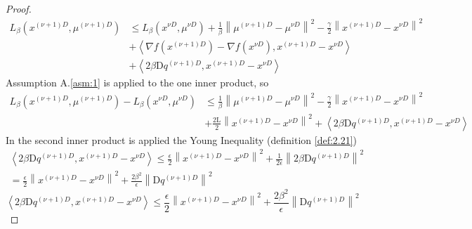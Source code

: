 \begin{proof}
\begin{equation*}
            \begin{align}
                L_{\beta}(x^{(\nu + 1)D}, \mu^{(\nu + 1)D}) &\leq L_{\beta}(x^{\nu D}, \mu^{\nu D}) + \frac{1}{\beta} \left \lVert \mu^{(\nu + 1)D} - \mu^{\nu D} \right \rVert^2 - \frac{\gamma}{2}\left \lVert x^{(\nu + 1)D} - x^{\nu D} \right \rVert^2 \\
                &+ \left \langle \nabla f(x^{(\nu + 1)D}) - \nabla f(x^{\nu D}), x^{(\nu + 1)D} - x^{\nu D} \right \rangle\\
                &+  \left \langle 2 \beta\mathrm{D}q^{(\nu + 1)D}, x^{(\nu + 1)D} - x^{\nu D} \right \rangle  
            \end{align}
        \end{equation*}
        Assumption A.\ref{asm:1} is applied to the one inner product, so
        \begin{equation}\label{eq:3.2.8}
            \begin{align}
                L_{\beta}(x^{(\nu + 1)D}, \mu^{(\nu + 1)D}) - L_{\beta}(x^{\nu D}, \mu^{\nu D}) &\leq \frac{1}{\beta} \left \lVert \mu^{(\nu + 1)D} - \mu^{\nu D} \right \rVert^2 - \frac{\gamma}{2}\left \lVert x^{(\nu + 1)D} - x^{\nu D} \right \rVert^2 \\
                &+\frac{2\mathrm{L}}{2} \left \lVert x^{(\nu + 1)D} - x^{\nu D} \right \rVert ^2 +  \left \langle 2 \beta \mathrm{D}q^{(\nu + 1)D}, x^{(\nu + 1)D} - x^{\nu D} \right \rangle
            \end{align}
        \end{equation}
        In the second inner product is applied the Young Inequality (definition \ref{def:2.21})
        \begin{equation*}
            \begin{align}
                \left \langle 2 \beta \mathrm{D}q^{(\nu + 1)D}, x^{(\nu + 1)D} - x^{\nu D} \right \rangle \leq \frac{\epsilon}{2}\left \lVert x^{(\nu + 1)D} - x^{\nu D} \right \rVert ^2 + \frac{1}{2\epsilon}\left \lVert 2 \beta \mathrm{D}q^{(\nu + 1)D} \right \rVert ^2\\
                = \frac{\epsilon}{2}\left \lVert x^{(\nu + 1)D} - x^{\nu D} \right \rVert ^2 + \frac{2 \beta^2}{\epsilon} \left \lVert \mathrm{D}q^{(\nu + 1)D} \right \rVert ^2
            \end{align}
        \end{equation*}
        \begin{equation}\label{eq:3.2.9}
            \left \langle 2 \beta \mathrm{D}q^{(\nu + 1)D}, x^{(\nu + 1)D} - x^{\nu D} \right \rangle \leq \frac{\epsilon}{2}\left \lVert x^{(\nu + 1)D} - x^{\nu D} \right \rVert ^2 + \frac{2 \beta^2}{\epsilon} \left \lVert \mathrm{D}q^{(\nu + 1)D} \right \rVert ^2

\end{equation}
\end{proof}

